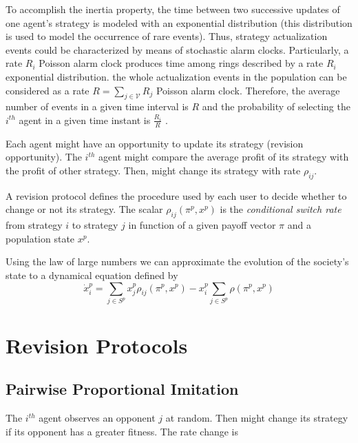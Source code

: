 \documentclass[a4paper,10pt]{article}
\def\th{^{th}}
\begin{document}
To accomplish the inertia property, the time between two successive updates of one 
agent's strategy is modeled with an exponential distribution (this distribution is used to model the occurrence of rare events). 
Thus, strategy actualization events could be characterized by means of stochastic alarm clocks.
Particularly, a rate $R_i$ Poisson alarm clock produces time among rings described by
a rate $R_i$ exponential distribution.
the whole actualization events in the population can be considered as a rate $R=\sum_{j\in \mathcal{V}} R_j$ Poisson alarm clock.
Therefore, the average number of events in a given time interval is $R$ and the probability of selecting the $i^{th}$
agent in a given time instant is
 $\frac{R_i}{R}$ \cite{sandholm_book}.

Each agent might have an opportunity to update its strategy (revision opportunity). The $i\th$ agent might compare the average profit of its strategy with the profit of other strategy. Then, might change its strategy with rate $\rho_{ij}$.
 
 A revision protocol defines the procedure used by each user to decide whether to change or not its strategy. The scalar $\rho_{ij} (\pi^p, x^p)$ is the \emph{conditional switch rate} from strategy $i$ to strategy $j$ in function of a given payoff vector $\pi$ and a population state $x^p$.
 
 Using the law of large numbers we can approximate the evolution of the society's state to a dynamical equation defined by
 \begin{equation}\label{eq:mean_dynamic}
  \dot{x}_i^p = \sum_{j\in S^p} x_j^p \rho_{ij} (\pi^p, x^p) - x_i^p \sum_{j\in S^p} \rho(\pi^p, x^p)
 \end{equation}



\section{Revision Protocols}


\subsection{Pairwise Proportional Imitation}

The $i\th$ agent observes an opponent $j$ at random. Then might change its strategy if  its opponent has a greater fitness. The rate change is 
\end{document}

